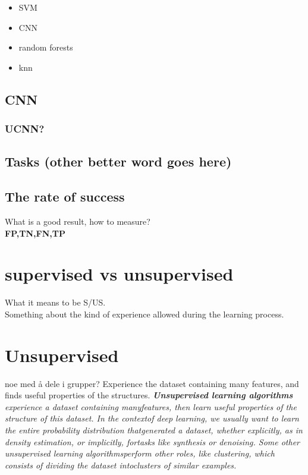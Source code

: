 \documentclass[a4paper,english]{ifimaster}
\begin{document}
	  \begin{itemize}
	    \item SVM 
	    \item CNN 
	    \item random forests
	    \item knn
	  \end{itemize}
	  
	  \subsection{CNN}
	  \subsubsection{UCNN?}
	  
	  
	  
	  
	  
	
	
	
	
	  \subsection{Tasks (other better word goes here)}
\label{chap:Tasks}

\subsection{The rate of success}
What is a good result, how to measure?\\
\textbf{FP,TN,FN,TP}\\


\section{supervised vs unsupervised}
What it means to be S/US.\\
Something about the kind of experience allowed during the learning process.


\section{Unsupervised}
noe med å dele i grupper?
Experience the dataset containing many features, and finds useful properties of the structures. 
\textit{\textbf{Unsupervised learning algorithms} experience a dataset containing manyfeatures, then learn useful properties of the structure of this dataset. In the contextof deep learning, we usually want to learn the entire probability distribution thatgenerated a dataset, whether explicitly, as in density estimation, or implicitly, fortasks like synthesis or denoising. Some other unsupervised learning algorithmsperform other roles, like clustering, which consists of dividing the dataset intoclusters of similar examples.}
\cite{Goodfellow-et-al-2016}
\end{document}
